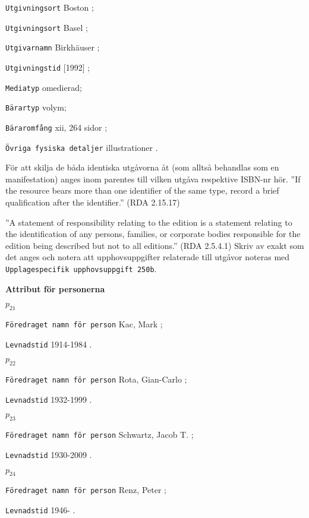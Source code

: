 \documentclass[a4,12pt]{article}
\begin{document}
 \texttt{Utgivningsort} Boston ;

 \texttt{Utgivningsort} Basel ;

 \texttt{Utgivarnamn} Birkhäuser ;

 \texttt{Utgivningstid} [1992] ;
 
  \texttt{Mediatyp}  omedierad;
 
 \texttt{Bärartyp}  volym;

\texttt{Bäraromfång} xii, 264 sidor ;

\texttt{Övriga fysiska detaljer} illustrationer .

\vspace{3mm}
För att skilja de båda identiska utgåvorna åt (som alltså behandlas
som en manifestation) anges inom parentes till vilken utgåva
respektive ISBN-nr hör. ''If the resource bears more than one
identifier of the same type, record a brief qualification after the
identifier.'' (RDA 2.15.17)

''A statement of responsibility relating to the edition is a statement
relating to the identification of any persons, families, or corporate
bodies responsible for the edition being described but not to all
editions.'' (RDA 2.5.4.1) Skriv av exakt som det anges och notera att
upphovsuppgifter relaterade till utgåvor noteras med \texttt{Upplagespecifik upphovsuppgift 250b}.

\vspace{3mm}

\textbf{Attribut för personerna}

\noindent $p_21$ 

\texttt{Föredraget namn för person} Kac, Mark ; 

\texttt{Levnadstid} 1914-1984 .

\noindent $p_22$

\texttt{Föredraget namn för person} Rota, Gian-Carlo ; 

\texttt{Levnadstid} 1932-1999 .
 


\noindent $p_23$

\texttt{Föredraget namn för person} Schwartz, Jacob T. ; 

\texttt{Levnadstid} 1930-2009 .
 


\noindent $p_24$ 

\texttt{Föredraget namn för person} Renz, Peter ;

\texttt{Levnadstid} 1946- .
\end{document}
